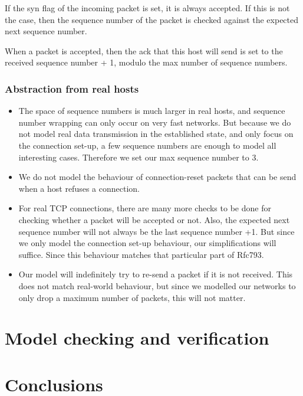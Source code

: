 \documentclass[twocolumn]{article}
\begin{document}
If the syn flag of the incoming packet is set, it is always accepted. If this is not the case, then the sequence number of the packet is checked against the expected next sequence number.

When a packet is accepted, then the ack that this host will send is set to the received sequence number + 1, modulo the max number of sequence numbers.


\subsubsection{Abstraction from real hosts}
\begin{itemize}
\item The space of sequence numbers is much larger in real hosts, and sequence number wrapping can only occur on very fast networks. But because we do not model real data transmission in the established state, and only focus on the connection set-up, a few sequence numbers are enough to model all interesting cases. Therefore we set our max sequence number to 3.
\item We do not model the behaviour of connection-reset packets that can be send when a host refuses a connection.
\item For real TCP connections, there are many more checks to be done for checking whether a packet will be accepted or not. Also, the expected next sequence number will not always be the last sequence number +1. But since we only model the connection set-up behaviour, our simplifications will suffice. Since this behaviour matches that particular part of Rfc793.
\item Our model will indefinitely try to re-send a packet if it is not received. This does not match real-world behaviour, but since we modelled our networks to only drop a maximum number of packets, this will not matter.
\end{itemize}






\section{Model checking and verification}

\section{Conclusions}
\end{document}
